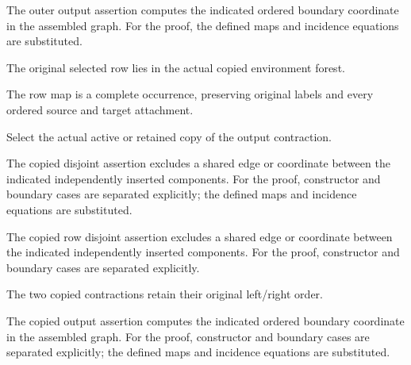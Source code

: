 The outer output assertion computes the indicated ordered boundary coordinate in the assembled graph.
For the proof, the defined maps and incidence equations are substituted.
\par{}

The original selected row lies in the actual copied environment forest.
\par{}

The row map is a complete occurrence, preserving original labels and every ordered source and target attachment.
\par{}

Select the actual active or retained copy of the output contraction.
\par{}

The copied disjoint assertion excludes a shared edge or coordinate between the indicated independently inserted components.
For the proof, constructor and boundary cases are separated explicitly; the defined maps and incidence equations are substituted.
\par{}

The copied row disjoint assertion excludes a shared edge or coordinate between the indicated independently inserted components.
For the proof, constructor and boundary cases are separated explicitly.
\par{}

The two copied contractions retain their original left/right order.
\par{}

The copied output assertion computes the indicated ordered boundary coordinate in the assembled graph.
For the proof, constructor and boundary cases are separated explicitly; the defined maps and incidence equations are substituted.
\par{}

